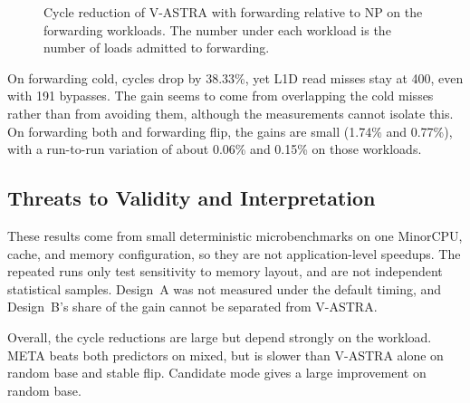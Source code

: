 \begin{figure}[H]
    \centering
    \caption{Cycle reduction of V-ASTRA with forwarding relative to NP on
    the forwarding workloads. The number under each workload is the
    number of loads admitted to forwarding.}
    \label{tab:forwarding-performance}
\end{figure}

On forwarding cold, cycles drop by 38.33\%, yet L1D read misses stay
at 400, even with 191 bypasses. The gain seems to come from
overlapping the cold misses rather than from avoiding them, although
the measurements cannot isolate this. On forwarding both and
forwarding flip, the gains are small (1.74\% and 0.77\%), with a
run-to-run variation of about 0.06\% and 0.15\% on those workloads.

\subsection{Threats to Validity and Interpretation}
\label{subsec:performance-limitations}

These results come from small deterministic microbenchmarks on one
MinorCPU, cache, and memory configuration, so they are not
application-level speedups. The repeated runs only test sensitivity to
memory layout, and are not independent statistical samples. Design~A
was not measured under the default timing, and Design~B's share of
the gain cannot be separated from V-ASTRA.

Overall, the cycle reductions are large but depend strongly on the
workload. META beats both predictors on mixed, but is slower than
V-ASTRA alone on random base and stable flip. Candidate mode gives a
large improvement on random base.
